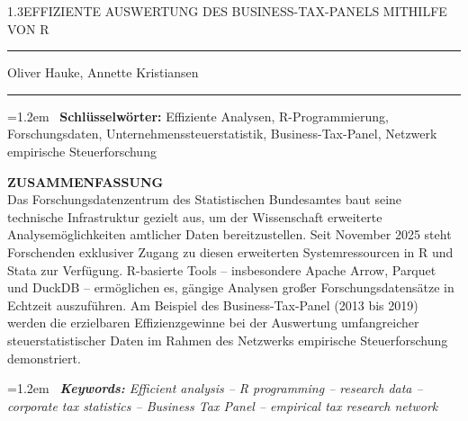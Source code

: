 \documentclass[
  german,
  10pt,
  twoside]{article}
\begin{document}
\begin{titlepage}
\begin{minipage}[t]{11.8cm}
{\LARGE\color{wistaDarkGray}\begin{spacing}{1.3}\MakeUppercase{Effiziente Auswertung des Business-Tax-Panels mithilfe von R}\end{spacing}}

\vspace{-0.2cm}

{\color{wistaBlue}\rule{\linewidth}{0.5pt}}

\vspace{0.5cm}

{\large\color{wistaDarkGray} Oliver Hauke, Annette Kristiansen}

\vspace{0.05cm}

{\color{wistaBlue}\rule{\linewidth}{0.5pt}}

\vspace{0.5cm}

\hangindent=1.2em
{\color{wistaBlue}\ {\bfseries Schlüsselwörter:} Effiziente Analysen, R-Programmierung, Forschungsdaten, Unternehmenssteuerstatistik, Business-Tax-Panel, Netzwerk empirische Steuerforschung}

\vspace{0.3cm}

{\color{wistaDarkGray}\bfseries\MakeUppercase{Zusammenfassung}}\\[0.15cm]
\small
Das Forschungsdatenzentrum des Statistischen Bundesamtes baut seine technische Infrastruktur gezielt aus, um der Wissenschaft erweiterte Analysemöglichkeiten amtlicher Daten bereitzustellen. Seit November 2025 steht Forschenden exklusiver Zugang zu diesen erweiterten Systemressourcen in R und Stata zur Verfügung. R-basierte Tools -- insbesondere Apache Arrow, Parquet und DuckDB -- ermöglichen es, gängige Analysen großer Forschungsdatensätze in Echtzeit auszuführen. Am Beispiel des Business-Tax-Panel (2013 bis 2019) werden die erzielbaren Effizienzgewinne bei der Auswertung umfangreicher steuerstatistischer Daten im Rahmen des Netzwerks empirische Steuerforschung demonstriert.

\vspace{0.5cm}

\hangindent=1.2em
{\itshape\color{wistaBlue}\ {\bfseries Keywords:} Efficient analysis -- R programming -- research data -- corporate tax statistics -- Business Tax Panel -- empirical tax research network}


\end{minipage}
\end{titlepage}
\end{document}
